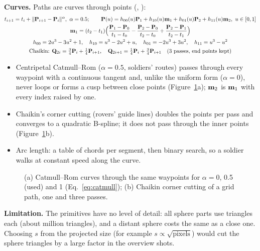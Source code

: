 \textbf{Curves.} Paths are curves through points (, ):
\begin{gather}
t_{i+1}=t_i+\lVert\vect P_{i+1}-\vect P_i\rVert^{\alpha},\ \alpha=0.5;\qquad
\vect P(u)=h_{00}(u)\vect P_1+h_{10}(u)\vect m_1+h_{01}(u)\vect P_2+h_{11}(u)\vect m_2,\ u\in[0,1]\label{eq:catmull}\\
\vect m_1=(t_2-t_1)\Big(\frac{\vect P_1-\vect P_0}{t_1-t_0}-\frac{\vect P_2-\vect P_0}{t_2-t_0}+\frac{\vect P_2-\vect P_1}{t_2-t_1}\Big)\nonumber\\
h_{00}=2u^3-3u^2+1,\quad h_{10}=u^3-2u^2+u,\quad h_{01}=-2u^3+3u^2,\quad h_{11}=u^3-u^2\nonumber\\
\text{Chaikin: } \vect Q_{2i}=\tfrac34\vect P_i+\tfrac14\vect P_{i+1},\quad \vect Q_{2i+1}=\tfrac14\vect P_i+\tfrac34\vect P_{i+1}\quad(\text{3 passes, end points kept})\nonumber
\end{gather}
\begin{itemize}
\item Centripetal Catmull--Rom ($\alpha=0.5$, soldiers' routes) passes through every waypoint with a continuous tangent and,
unlike the uniform form ($\alpha=0$), never loops or forms a cusp between close points (Figure~\ref{fig:curves}a);
$\mathbf{m}_2$ is $\mathbf{m}_1$ with every index raised by one.
\item Chaikin's corner cutting (rovers' guide lines) doubles the points per pass and converges to a quadratic B-spline; it
does not pass through the inner points (Figure~\ref{fig:curves}b).
\item Arc length: a table of chords per segment, then binary search, so a soldier walks at constant speed along the curve.
\end{itemize}

\begin{figure}[htbp]
\centering{}
\caption{(a) Catmull--Rom curves through the same waypoints for $\alpha=0$, 0.5 (used) and 1 (Eq.~\eqref{eq:catmull});
(b) Chaikin corner cutting of a grid path, one and three passes.}
\label{fig:curves}
\end{figure}

\textbf{Limitation.} The primitives have no level of detail: all \nSphereInst{} sphere parts use \nSphereTri{}
triangles each (about \sphereTriTotal{} million triangles), and a distant sphere costs the same as a close one. Choosing
$s$ from the projected size (for example $s\propto\sqrt{\text{pixels}}$) would cut the sphere triangles by a large
factor in the overview shots.
